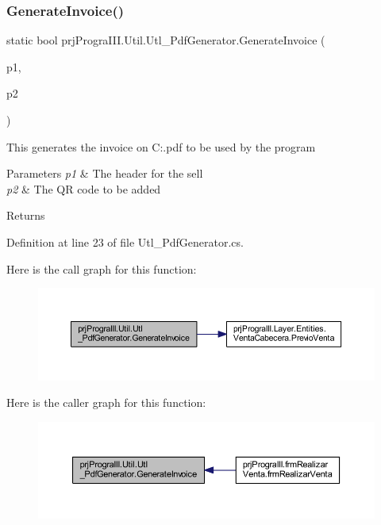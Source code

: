 \subsubsection{\texorpdfstring{Generate\+Invoice()}{GenerateInvoice()}}
{\footnotesize\ttfamily static bool prj\+Progra\+I\+I\+I.\+Util.\+Utl\+\_\+\+Pdf\+Generator.\+Generate\+Invoice (\begin{DoxyParamCaption}\item[{\hyperlink{classprj_progra_i_i_i_1_1_layer_1_1_entities_1_1_venta_cabecera}{Venta\+Cabecera}}]{p1,  }\item[{System.\+Drawing.\+Image}]{p2 }\end{DoxyParamCaption})\hspace{0.3cm}{\ttfamily [static]}}



This generates the invoice on C\+:.pdf to be used by the program 


\begin{DoxyParams}{Parameters}
{\em p1} & The header for the sell\\
\hline
{\em p2} & The QR code to be added\\
\hline
\end{DoxyParams}
\begin{DoxyReturn}{Returns}

\end{DoxyReturn}


Definition at line 23 of file Utl\+\_\+\+Pdf\+Generator.\+cs.

Here is the call graph for this function\+:
\nopagebreak
\begin{figure}[H]
\begin{center}
\leavevmode
\includegraphics[width=350pt]{classprj_progra_i_i_i_1_1_util_1_1_utl___pdf_generator_ab6b2282b30233a0f0292378aa9c5779d_cgraph}
\end{center}
\end{figure}
Here is the caller graph for this function\+:
\nopagebreak
\begin{figure}[H]
\begin{center}
\leavevmode
\includegraphics[width=350pt]{classprj_progra_i_i_i_1_1_util_1_1_utl___pdf_generator_ab6b2282b30233a0f0292378aa9c5779d_icgraph}
\end{center}
\end{figure}


